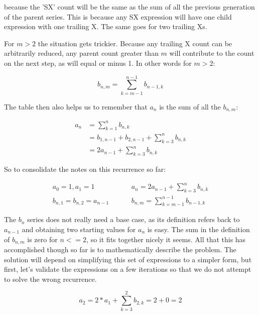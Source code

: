 \documentclass{article}
\begin{document}
because the 'SX' count will be the same as the sum of all the previous generation of the parent series.  This is because any SX expression will have one child expression with one trailing X.  The same goes for two trailing Xs.

\par

For $m > 2$ the situation gets trickier.  Because any trailing X count can be arbitrarily reduced, any parent count greater than $m$ will contribute to the count on the next step, as will equal or minus 1.  In other words for $m > 2$:

\begin{equation*}
  b_{n,m} = \sum_{k=m-1}^{n - 1} b_{n-1,k}
\end{equation*}

The table then also helps us to remember that $a_n$ is the sum of all the $b_{n,m}$:

\begin{align*}
  a_{n} &= \sum_{k=1}^{n} b_{n,k} \\
  &= b_{1,n-1} + b_{2,n-1} + \sum_{k=3}^{n} b_{n,k} \\
  &= 2 a_{n-1} + \sum_{k=3}^{n} b_{n,k}
\end{align*}

So to consolidate the notes on this recurrence so far:

\begin{align*}
  a_0 = 1, a_1 = 1 \hspace{1cm}
  &a_n = 2 a_{n-1} + \sum_{k=3}^{n} b_{n,k} \\
  b_{n,1} = b_{n,2} = a_{n-1} \hspace{1cm}
  &b_{n,m} = \sum_{k=m-1}^{n-1} b_{n-1,k}
\end{align*}

The $b_n$ series does not really need a base case, as its definition refers back to $a_{n-1}$ and obtaining two starting values for $a_n$ is easy.  The sum in the definition of $b_{n,m}$ is zero for $n <= 2$, so it fits together nicely it seems.  All that this has accomplished though so far is to mathematically describe the problem.  The solution will depend on simplifying this set of expressions to a simpler form, but first, let's validate the expressions on a few iterations so that we do not attempt to solve the wrong recurrence.

\begin{equation*}
  a_2 = 2 * a_1 + \sum_{k=3}^{2} b_{2,k} = 2 + 0 = 2
\end{equation*}
\end{document}
